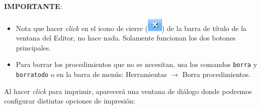 \noindent \textbf{IMPORTANTE}:
\begin{itemize}
   \item Nota que hacer \textit{click} en el icono de cierre 
      (\includegraphics[scale=0.4]{Imagenes/02_Caracteristicas/cerrar.png}) %
      de la barra de t\'itulo de la ventana del Editor, no hace nada. Solamente
      funcionan los dos botones principales.
   \item Para borrar los procedimientos que no se necesitan, usa los comandos
      \texttt{borra}  y 
      \texttt{borratodo}  o en la barra
      de men\'us: Herramientas $\rightarrow$ Borra procedimientos.
\end{itemize}
Al hacer \textit{click} para imprimir, aparecer\'a una ventana de di\'alogo
donde podremos configurar distintas opciones de impresi\'on:
